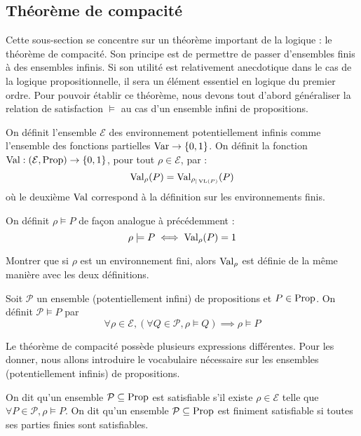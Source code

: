 \subsection{Théorème de compacité}

Cette sous-section se concentre sur un théorème important de la logique : le
théorème de compacité. Son principe est de permettre de passer d'ensembles finis
à des ensembles infinis. Si son utilité est relativement anecdotique dans le cas
de la logique propositionnelle, il sera un élément essentiel en logique du
premier ordre. Pour pouvoir établir ce théorème, nous devons tout d'abord
généraliser la relation de satisfaction $\vDash$ au cas d'un ensemble infini de
propositions.

\begin{definition}
  On définit l'ensemble $\mathcal E$ des environnement potentiellement infinis
  comme l'ensemble des fonctions partielles $\operatorname{Var} \to \{0,1\}$. On définit la
  fonction $\operatorname{Val} : (\mathcal E,\operatorname{Prop})\to \{0,1\}$, pour tout
  $\rho\in\mathcal E$, par :
  \[\operatorname{Val}_\rho(P) = \operatorname{Val}_{\rho_{|\operatorname{VL}(P)}}(P)\]
  où le deuxième $\operatorname{Val}$ correspond à la définition sur les environnements finis.

  On définit $\rho\models P$ de façon analogue à précédemment :
  \[\rho\models P \iff \operatorname{Val}_\rho(P) = 1\]
\end{definition}

\begin{exercise}
  Montrer que si $\rho$ est un environnement fini, alors $\operatorname{Val}_\rho$ est définie
  de la même manière avec les deux définitions.
\end{exercise}

\begin{definition}
  Soit $\mathcal P$ un ensemble (potentiellement infini) de propositions et
  $P\in\operatorname{Prop}$. On définit $\mathcal P\vDash P$ par
  \[\forall \rho\in\mathcal E, (\forall Q \in\mathcal P, \rho\models Q)
  \implies \rho\models P\]
\end{definition}

Le théorème de compacité possède plusieurs expressions différentes. Pour les
donner, nous allons introduire le vocabulaire nécessaire sur les ensembles
(potentiellement infinis) de propositions.

\begin{definition}[Satisfiabilité]
  On dit qu'un ensemble $\mathcal P\subseteq\operatorname{Prop}$ est satisfiable s'il existe
  $\rho\in\mathcal E$ telle que $\forall P\in\mathcal P, \rho\models P$. On dit
  qu'un ensemble $\mathcal P\subseteq\operatorname{Prop}$ est finiment satisfiable si toutes
  ses parties finies sont satisfiables.
\end{definition}


